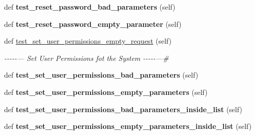 \begin{DoxyCompactItemize}
\mbox{\label{classtests_1_1test__15__testing__invalid__requests_1_1_test_user_routes_a832b04fc2ff672d7e7f16782f00bbbfc}} 
def {\bfseries test\+\_\+reset\+\_\+password\+\_\+bad\+\_\+parameters} (self)
\item 
\mbox{\label{classtests_1_1test__15__testing__invalid__requests_1_1_test_user_routes_aede84bd207b4a593e3c72549f9917d1e}} 
def {\bfseries test\+\_\+reset\+\_\+password\+\_\+empty\+\_\+parameter} (self)
\item 
\mbox{\label{classtests_1_1test__15__testing__invalid__requests_1_1_test_user_routes_a413f48a9ff2af1535c7852bd95a850a4}} 
def \hyperlink{classtests_1_1test__15__testing__invalid__requests_1_1_test_user_routes_a413f48a9ff2af1535c7852bd95a850a4}{test\+\_\+set\+\_\+user\+\_\+permissions\+\_\+empty\+\_\+request} (self)
\begin{DoxyCompactList}\small\item\em -\/-\/-\/-\/-\/--- Set User Permissions fot the System -\/-\/-\/-\/-\/---\# \end{DoxyCompactList}\item 
\mbox{\label{classtests_1_1test__15__testing__invalid__requests_1_1_test_user_routes_a7f415b4ecf3cb5368aed57c42f85bf71}} 
def {\bfseries test\+\_\+set\+\_\+user\+\_\+permissions\+\_\+bad\+\_\+parameters} (self)
\item 
\mbox{\label{classtests_1_1test__15__testing__invalid__requests_1_1_test_user_routes_a8c69f3e8eeee7dd7b7f00cb607674568}} 
def {\bfseries test\+\_\+set\+\_\+user\+\_\+permissions\+\_\+empty\+\_\+parameters} (self)
\item 
\mbox{\label{classtests_1_1test__15__testing__invalid__requests_1_1_test_user_routes_a82d9a1a35a3ca6175559914bf6709c58}} 
def {\bfseries test\+\_\+set\+\_\+user\+\_\+permissions\+\_\+bad\+\_\+parameters\+\_\+inside\+\_\+list} (self)
\item 
\mbox{\label{classtests_1_1test__15__testing__invalid__requests_1_1_test_user_routes_af47fcbbd93ed8ebf045d05e535ea6d99}} 
def {\bfseries test\+\_\+set\+\_\+user\+\_\+permissions\+\_\+empty\+\_\+parameters\+\_\+inside\+\_\+list} (self)
\end{DoxyCompactItemize}
